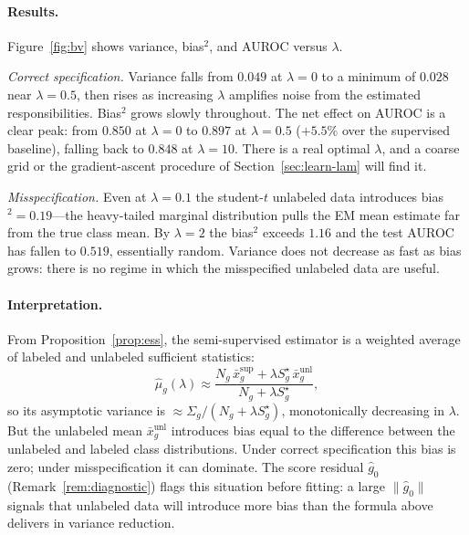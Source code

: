 \documentclass[11pt]{article}
\theoremstyle{definition}
\newcommand{\lam}{\lambda}
\newcommand{\Sig}{\Sigma}
\begin{document}
\paragraph{Results.}
Figure~\ref{fig:bv} shows variance, bias\(^2\), and AUROC versus \(\lam\).

\emph{Correct specification.}
Variance falls from \(0.049\) at \(\lam=0\) to a minimum of \(0.028\) near
\(\lam=0.5\), then rises as increasing \(\lam\) amplifies noise from the
estimated responsibilities.
Bias\(^2\) grows slowly throughout.
The net effect on AUROC is a clear peak: from \(0.850\) at \(\lam=0\)
to \(0.897\) at \(\lam=0.5\) (\(+5.5\%\) over the supervised baseline),
falling back to \(0.848\) at \(\lam=10\).
There is a real optimal \(\lam\), and a coarse grid or the gradient-ascent
procedure of Section~\ref{sec:learn-lam} will find it.

\emph{Misspecification.}
Even at \(\lam=0.1\) the student-\(t\) unlabeled data introduces bias\(^2=0.19\)---the
heavy-tailed marginal distribution pulls the EM mean estimate
far from the true class mean.
By \(\lam=2\) the bias\(^2\) exceeds \(1.16\) and the test AUROC has
fallen to \(0.519\), essentially random.
Variance does not decrease as fast as bias grows: there is no regime in which the
misspecified unlabeled data are useful.

\paragraph{Interpretation.}
From Proposition~\ref{prop:ess}, the semi-supervised estimator is a
weighted average of labeled and unlabeled sufficient statistics:
\[
\hat\mu_g(\lam) \approx
\frac{N_g\,\bar x_g^{\text{sup}} + \lam S_g^\star\,\bar x_g^{\text{unl}}}
     {N_g + \lam S_g^\star},
\]
so its asymptotic variance is \(\approx\Sig_g/(N_g+\lam S_g^\star)\),
monotonically decreasing in \(\lam\).
But the unlabeled mean \(\bar x_g^{\text{unl}}\) introduces bias equal to
the difference between the unlabeled and labeled class distributions.
Under correct specification this bias is zero; under misspecification
it can dominate.
The score residual \(\hat g_0\) (Remark~\ref{rem:diagnostic}) flags
this situation before fitting: a large \(\|\hat g_0\|\) signals that
unlabeled data will introduce more bias than the formula above delivers
in variance reduction.
\end{document}
